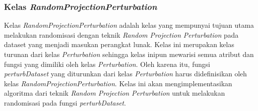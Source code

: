 \subsubsection{Kelas \textit{RandomProjectionPerturbation}}
\label{subsubsec:kelas-rpp}

Kelas \textit{RandomProjectionPerturbation} adalah kelas yang mempunyai tujuan utama melakukan randomisasi dengan teknik \textit{Random Projection Perturbation} pada dataset yang menjadi masukan perangkat lunak. Kelas ini merupakan kelas turunan dari kelas \textit{Perturbation} sehingga kelas inipun mewarisi semua atribut dan fungsi yang dimiliki oleh kelas \textit{Perturbation}. Oleh karena itu, fungsi \textit{perturbDataset} yang diturunkan dari kelas \textit{Perturbation} harus didefinisikan oleh kelas \textit{RandomProjectionPerturbation}. Kelas ini akan mengimplementasikan algoritma dari teknik \textit{Random Projection Perturbation} untuk melakukan randomisasi pada fungsi \textit{perturbDataset}.

